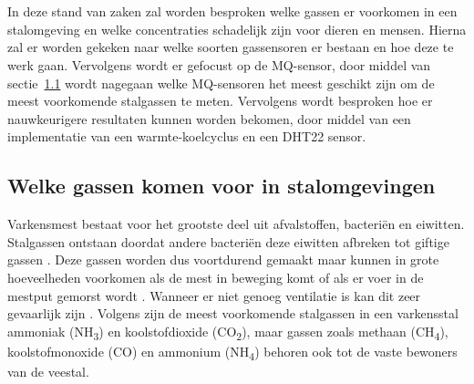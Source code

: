 \chapter{}%
\label{ch:stand-van-zaken}



In deze stand van zaken zal worden besproken welke gassen er voorkomen in een stalomgeving en welke concentraties schadelijk zijn voor dieren en mensen. Hierna zal er worden gekeken naar welke soorten gassensoren er bestaan en hoe deze te werk gaan. Vervolgens wordt er gefocust op de MQ-sensor, door middel van sectie~\ref{sec:welke-stalgassen} wordt nagegaan welke MQ-sensoren het meest geschikt zijn om de meest voorkomende stalgassen te meten. Vervolgens wordt besproken hoe er nauwkeurigere resultaten kunnen worden bekomen, door middel van een implementatie van een warmte-koelcyclus en een DHT22 sensor.


\section{Welke gassen komen voor in stalomgevingen}%
\label{sec:welke-stalgassen}

Varkensmest bestaat voor het grootste deel uit afvalstoffen, bacteriën en eiwitten. Stalgassen ontstaan doordat andere bacteriën deze eiwitten afbreken tot giftige gassen \autocite{Wolf2013}. Deze gassen worden dus voortdurend gemaakt maar kunnen in grote hoeveelheden voorkomen als de mest in beweging komt of als er voer in de mestput gemorst wordt \autocite{Wolf2013}. Wanneer er niet genoeg ventilatie is kan dit zeer gevaarlijk zijn \autocite{Heesbeen2021}. Volgens \textcite{Klooster1993} zijn de meest voorkomende stalgassen in een varkensstal ammoniak (NH\textsubscript{3}) en koolstofdioxide (CO\textsubscript{2}), maar gassen zoals methaan (CH\textsubscript{4}), koolstofmonoxide (CO) en ammonium (NH\textsubscript{4}) behoren ook tot de vaste bewoners van de veestal.

